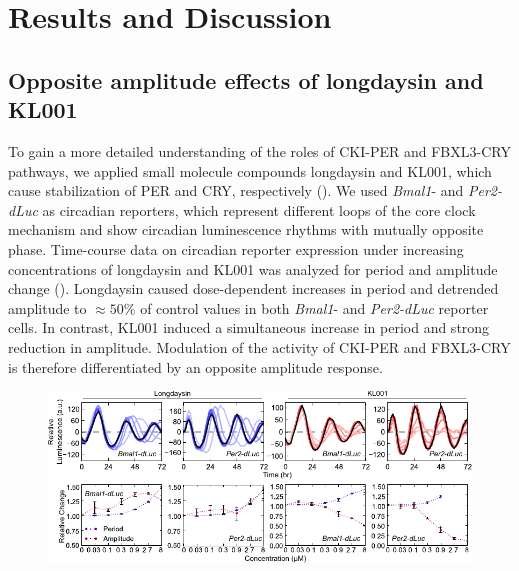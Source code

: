 \section{Results and Discussion}
\subsection{Opposite amplitude effects of longdaysin and KL001}
To gain a more detailed understanding of the roles of CKI-PER and FBXL3-CRY pathways, we applied small molecule compounds longdaysin and KL001, which cause stabilization of PER and CRY, respectively \cite{Hirota2010, Hirota2012} (). 
We used {\it Bmal1}- and {\it Per2-dLuc} as circadian reporters, which represent different loops of the core clock mechanism and show circadian luminescence rhythms with mutually opposite phase. 
Time-course data on circadian reporter expression under increasing concentrations of longdaysin and KL001 \cite{Hirota2012} was analyzed for period and amplitude change ().
Longdaysin caused dose-dependent increases in period and detrended amplitude to $\approx 50\%$ of control values in both {\it Bmal1}- and {\it Per2-dLuc} reporter cells. 
In contrast, KL001 induced a simultaneous increase in period and strong reduction in amplitude. 
Modulation of the activity of CKI-PER and FBXL3-CRY is therefore differentiated by an opposite amplitude response.

\begin{figure}[h]
  \centering
  \includegraphics[width=\textwidth]{chap4/figures/fig1_ts.pdf}
  \label{fig:4-1b}
\end{figure}

